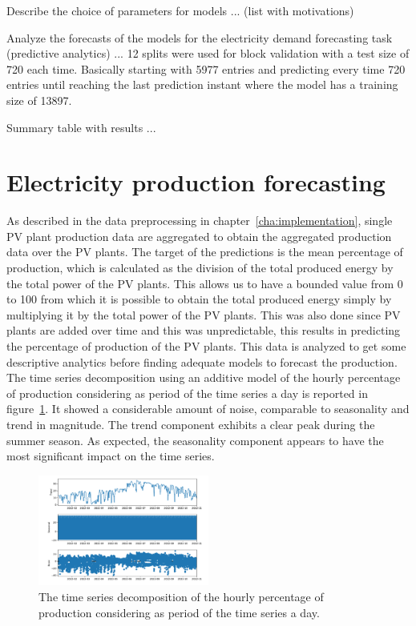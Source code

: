 Describe the choice of parameters for models ... (list with motivations)

Analyze the forecasts of the models for the electricity demand forecasting task (predictive analytics) ...
12 splits were used for block validation with a test size of 720 each time.
Basically starting with 5977 entries and predicting every time 720 entries until reaching the last prediction instant where the model has a training size of 13897.

Summary table with results ...


\section{Electricity production forecasting}
\label{sec:productionval}
\vspace{0.2 cm}

As described in the data preprocessing in chapter~\ref{cha:implementation}, single PV plant production data are aggregated to obtain the aggregated production data over the PV plants.
The target of the predictions is the mean percentage of production, which is calculated as the division of the total produced energy by the total power of the PV plants.
This allows us to have a bounded value from 0 to 100 from which it is possible to obtain the total produced energy simply by multiplying it by the total power of the PV plants.
This was also done since PV plants are added over time and this was unpredictable, this results in predicting the percentage of production of the PV plants.
This data is analyzed to get some descriptive analytics before finding adequate models to forecast the production.
The time series decomposition using an additive model of the hourly percentage of production considering as period of the time series a day is reported in figure~\ref{fig:productiondecomposition}.
It showed a considerable amount of noise, comparable to seasonality and trend in magnitude.
The trend component exhibits a clear peak during the summer season.
As expected, the seasonality component appears to have the most significant impact on the time series.

\begin{figure}[H]
\centering
\includegraphics[width=0.5\textwidth]{images/production/hourly_decomposition}
\caption{The time series decomposition of the hourly percentage of production considering as period of the time series a day.}
\label{fig:productiondecomposition}
\end{figure}

